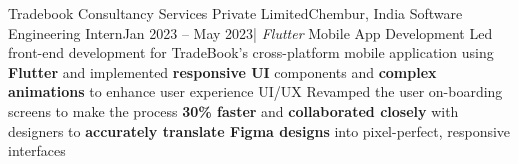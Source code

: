     \resumeSubheading
    {Tradebook Consultancy Services Private Limited}{Chembur, India}
    {Software Engineering Intern}{Jan 2023 -- May 2023}{| \textit{Flutter}}
    \resumeItemListStart
    \resumeItem
      {Mobile App Development}
      {Led front-end development for TradeBook's cross-platform mobile application using \textbf{Flutter} and implemented \textbf{responsive UI} components and \textbf{complex animations} to enhance user experience}
    \resumeItem
      {UI/UX}
      {Revamped the user on-boarding screens to make the process \textbf{30\% faster} and \textbf{collaborated closely} with designers to \textbf{accurately translate Figma designs} into pixel-perfect, responsive interfaces} 
    \resumeItemListEnd
